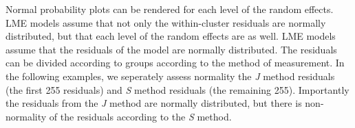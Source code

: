 \documentclass[]{report}
\begin{document}
	Normal probability plots can be rendered for each level of the random effects.  LME models assume that not only the within-cluster residuals are normally distributed, but that each level of the random effects are as well. LME models assume that the residuals of the model are normally distributed.  The residuals can be divided according to groups according to the method of measurement. In the following examples, we seperately assess normality the \textit{J} method residuals (the first 255 residuals) and \textit{S} method residuals (the remaining 255). Importantly the residuals from the \textit{J} method are normally distributed, but there is non-normality of the residuals according to the \textit{S} method.
	

	
	
	
	
	

	
	
	
%	
%	
%
%	
\end{document}
